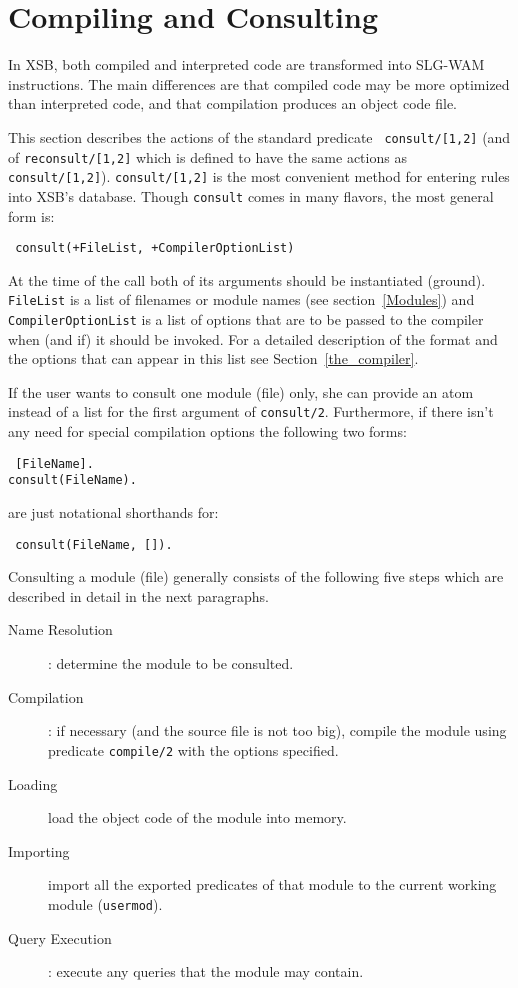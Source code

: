 \section{Compiling and Consulting} \label{Consulting}
In XSB, both compiled and interpreted code are transformed into
SLG-WAM instructions.  The main differences are that compiled code may
be more optimized than interpreted code, and that compilation produces
an object code file.

This section describes the actions of the standard predicate {\tt
consult/[1,2]} (and of {\tt reconsult/[1,2]} which is defined to have
the same actions as {\tt consult/[1,2]}).  {\tt consult/[1,2]} is the
most convenient method for entering rules into XSB's database.  Though
{\tt consult} comes in many flavors, the most general form is:
\begin{center}{\tt
	consult(+FileList, +CompilerOptionList) }
\end{center} 
At the time of the call both of its arguments should be instantiated
(ground).  {\tt FileList} is a list of filenames or module names (see
section~\ref{Modules}) and {\tt CompilerOptionList} is a list of
options that are to be passed to the compiler when (and if) it should
be invoked.  For a detailed description of the format and the options
that can appear in this list see Section~\ref{the_compiler}.

If the user wants to consult one module (file) only, she can provide an
atom instead of a list for the first argument of {\tt consult/2}.
Furthermore, if there isn't any need for special compilation options the
following two forms:
\begin{center}{\tt
	    [FileName]. \\
	consult(FileName).
}\end{center}
are just notational shorthands for:
\begin{center}{\tt
	consult(FileName, []).
}\end{center}

Consulting a module (file) generally consists of the following five
steps which are described in detail in the next paragraphs.
\begin{description}
\item[Name Resolution]: determine the module to be consulted.
\item[Compilation]:  if necessary (and the source file is not too big),
      compile the module using predicate {\tt compile/2} with the options
      specified.
\item[Loading] load the object code of the module into memory.
\item[Importing] import all the exported predicates of that module to
      the current working module ({\tt usermod}).
\item[Query Execution]: execute any queries that the module may contain.
\end{description}

